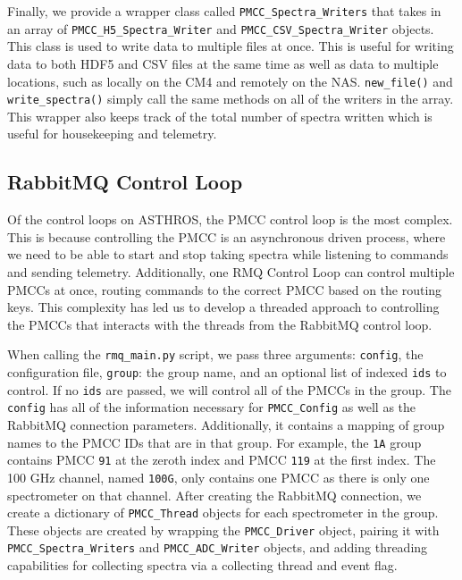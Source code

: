 Finally, we provide a wrapper class called \texttt{PMCC\_Spectra\_Writers} that takes in an array of \texttt{PMCC\_H5\_Spectra\_Writer} and \texttt{PMCC\_CSV\_Spectra\_Writer} objects.
This class is used to write data to multiple files at once. 
This is useful for writing data to both HDF5 and CSV files at the same time as well as data to multiple locations, such as locally on the CM4 and remotely on the NAS. 
\texttt{new\_file()} and \texttt{write\_spectra()} simply call the same methods on all of the writers in the array.
This wrapper also keeps track of the total number of spectra written which is useful for housekeeping and telemetry. 

\subsection{RabbitMQ Control Loop}
Of the control loops on ASTHROS, the PMCC control loop is the most complex.
This is because controlling the PMCC is an asynchronous driven process, where we need to be able to start and stop taking spectra while listening to commands and sending telemetry.
Additionally, one RMQ Control Loop can control multiple PMCCs at once, routing commands to the correct PMCC based on the routing keys. 
This complexity has led us to develop a threaded approach to controlling the PMCCs that interacts with the threads from the RabbitMQ control loop.

When calling the \texttt{rmq\_main.py} script, we pass three arguments: \texttt{config}, the configuration file, \texttt{group}: the group name, and an optional list of indexed \texttt{ids} to control.
If no \texttt{ids} are passed, we will control all of the PMCCs in the group.
The \texttt{config} has all of the information necessary for \texttt{PMCC\_Config} as well as the RabbitMQ connection parameters.
Additionally, it contains a mapping of group names to the PMCC IDs that are in that group.
For example, the \texttt{1A} group contains PMCC \texttt{91} at the zeroth index and PMCC \texttt{119} at the first index.
The 100 GHz channel, named \texttt{100G}, only contains one PMCC as there is only one spectrometer on that channel.
After creating the RabbitMQ connection, we create a dictionary of \texttt{PMCC\_Thread} objects for each spectrometer in the group.
These objects are created by wrapping the \texttt{PMCC\_Driver} object, pairing it with \texttt{PMCC\_Spectra\_Writers} and \texttt{PMCC\_ADC\_Writer} objects, and adding threading capabilities for collecting spectra via a collecting thread and event flag. 

